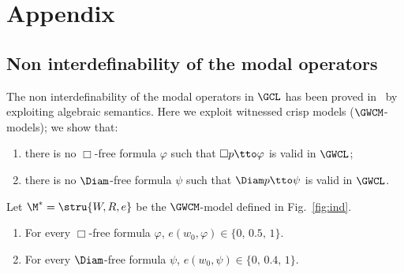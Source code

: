 


\section{Appendix}
\label{sec:appendix}

\subsection{Non  interdefinability of the modal operators}\label{app:noninterdBD}

The non interdefinability of the modal operators in $\GCL$ has been
proved in~\cite{RodriguezV:21} by exploiting algebraic semantics.
Here we exploit witnessed crisp models
($\GWCM$-models);  we show that:

\begin{enumerate}[label=(P\arabic*), ref=(P\arabic*),leftmargin=*]    
\item\label{defBD:P1}
  there is no  $\Box$-free formula $\varphi$ such that
  $\Box p \tto\varphi$ is valid in  $\GWCL$; 
  
\item\label{defBD:P2}
  there is no  $\Diam$-free formula $\psi$ such that
  $\Diam p \tto\psi$ is valid in  $\GWCL$. 
  
\end{enumerate}


\begin{lemma}\label{lemma:defBD}
  Let $\M^\ast=\stru{W,R,e}$ be the  $\GWCM$-model defined in Fig.~\ref{fig:ind}.
  \begin{enumerate}[label=(\roman*), ref=(\roman*),leftmargin=*]    
  \item\label{lemma:defBD:1} For every $\Box$-free formula $\varphi$,
    $e(w_0,\varphi)\in\{0,\,0.5,\,1\}$.
    
  \item\label{lemma:defBD:2} For every $\Diam$-free formula $\psi$,
    $e(w_0,\psi)\in\{0,\,0.4,\,1\}$.
  \end{enumerate}
\end{lemma}

